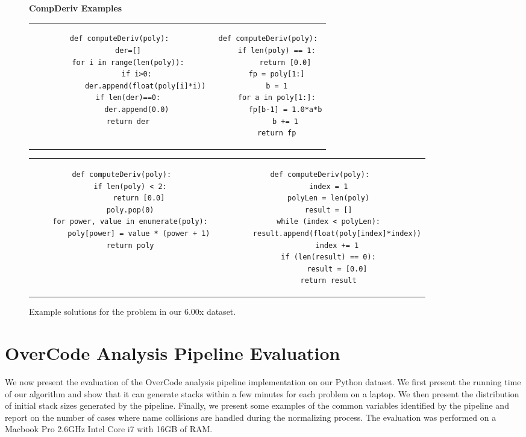 \begin{figure}
{\bf CompDeriv Examples}\\
\begin{tabular}{cc} 
\begin{minipage}{0.5\linewidth}
\begin{lstlisting}[]
def computeDeriv(poly):
    der=[]
    for i in range(len(poly)):
        if i>0:
            der.append(float(poly[i]*i))
    if len(der)==0:
        der.append(0.0)
    return der

\end{lstlisting}
\end{minipage}
&
\begin{minipage}{0.5\linewidth}
\begin{lstlisting}[]
def computeDeriv(poly):
    if len(poly) == 1:
        return [0.0]
    fp = poly[1:]
    b = 1
    for a in poly[1:]:
        fp[b-1] = 1.0*a*b
        b += 1
    return fp
\end{lstlisting}
\end{minipage}
\\
\end{tabular}
\begin{tabular}{c c}
\begin{minipage}{0.4\linewidth}
\begin{lstlisting}[]
def computeDeriv(poly):
    if len(poly) < 2:
        return [0.0]
    poly.pop(0)
    for power, value in enumerate(poly):
        poly[power] = value * (power + 1)
    return poly
\end{lstlisting}
\end{minipage}
&
\begin{minipage}{0.4\linewidth}
\begin{lstlisting}[]
def computeDeriv(poly):
    index = 1
    polyLen = len(poly)
    result = []
    while (index < polyLen):
        result.append(float(poly[index]*index))
        index += 1
    if (len(result) == 0):
        result = [0.0]
    return result
\end{lstlisting}
\end{minipage}

\end{tabular}
\caption{Example solutions for the  problem in our 6.00x dataset.}
\label{cdexamples}
\end{figure}


\section{OverCode Analysis Pipeline Evaluation}
We now present the evaluation of the OverCode analysis pipeline implementation on our Python dataset. We first present the running time of our algorithm and show that it can generate stacks within a few minutes for each problem on a laptop. We then present the distribution of initial stack sizes generated by the pipeline. Finally, we present some examples of the common variables identified by the pipeline and report on the number of cases where name collisions are handled during the normalizing process. The evaluation was performed on a Macbook Pro 2.6GHz Intel Core i7 with 16GB of RAM. %

